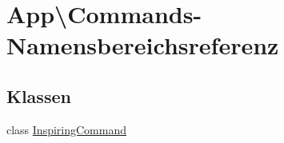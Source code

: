 \hypertarget{namespaceApp_1_1Commands}{}\section{App\textbackslash{}Commands-\/\+Namensbereichsreferenz}
\label{namespaceApp_1_1Commands}
\subsection*{Klassen}
\begin{DoxyCompactItemize}
\item 
class \hyperlink{classApp_1_1Commands_1_1InspiringCommand}{Inspiring\+Command}
\end{DoxyCompactItemize}
